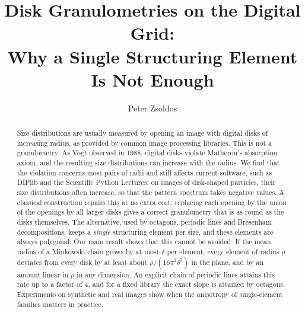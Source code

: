 \documentclass[runningheads]{llncs}
\begin{document}
\title{Disk Granulometries on the Digital Grid:\\ Why a Single Structuring Element Is Not Enough}
\author{Peter Zsoldos}
\maketitle

\begin{abstract}
Size distributions are usually measured by opening an image with digital disks of increasing radius, as provided by common image processing libraries. This is not a granulometry. As Vogt observed in 1988, digital disks violate Matheron's absorption axiom, and the resulting size distributions can increase with the radius. We find that the violation concerns most pairs of radii and still affects current software, such as DIPlib and the Scientific Python Lectures: on images of disk-shaped particles, their size distributions often increase, so that the pattern spectrum takes negative values. A classical construction repairs this at no extra cost: replacing each opening by the union of the openings by all larger disks gives a correct granulometry that is as round as the disks themselves. The alternative, used by octagons, periodic lines and Bresenham decompositions, keeps a \emph{single} structuring element per size, and these elements are always polygonal. Our main result shows that this cannot be avoided. If the mean radius of a Minkowski chain grows by at most $\delta$ per element, every element of radius $\rho$ deviates from every disk by at least about $\rho/(16\pi^2\delta^2)$ in the plane, and by an amount linear in $\rho$ in any dimension. An explicit chain of periodic lines attains this rate up to a factor of 4, and for a fixed library the exact slope is attained by octagons. Experiments on synthetic and real images show when the anisotropy of single-element families matters in practice.
\end{abstract}

\end{document}
